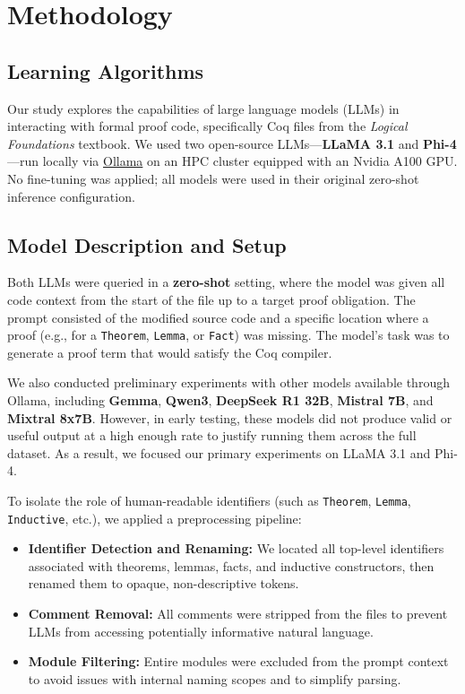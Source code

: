
\section{Methodology}
\label{sec:methodology}
\subsection{Learning Algorithms}

Our study explores the capabilities of large language models (LLMs) in interacting with formal proof code, specifically Coq files from the \textit{Logical Foundations} textbook. We used two open-source LLMs---\textbf{LLaMA 3.1} and \textbf{Phi-4}---run locally via \href{https://ollama.com}{Ollama} on an HPC cluster equipped with an Nvidia A100 GPU. No fine-tuning was applied; all models were used in their original zero-shot inference configuration.

\subsection{Model Description and Setup}

Both LLMs were queried in a \textbf{zero-shot} setting, where the model was given all code context from the start of the file up to a target proof obligation. The prompt consisted of the modified source code and a specific location where a proof (e.g., for a \texttt{Theorem}, \texttt{Lemma}, or \texttt{Fact}) was missing. The model’s task was to generate a proof term that would satisfy the Coq compiler.

We also conducted preliminary experiments with other models available through Ollama, including \textbf{Gemma}, \textbf{Qwen3}, \textbf{DeepSeek R1 32B}, \textbf{Mistral 7B}, and \textbf{Mixtral 8x7B}. However, in early testing, these models did not produce valid or useful output at a high enough rate to justify running them across the full dataset. As a result, we focused our primary experiments on LLaMA 3.1 and Phi-4.

To isolate the role of human-readable identifiers (such as \texttt{Theorem}, \texttt{Lemma}, \texttt{Inductive}, etc.), we applied a preprocessing pipeline:

\begin{itemize}
  \item \textbf{Identifier Detection and Renaming:} We located all top-level identifiers associated with theorems, lemmas, facts, and inductive constructors, then renamed them to opaque, non-descriptive tokens.
  \item \textbf{Comment Removal:} All comments were stripped from the files to prevent LLMs from accessing potentially informative natural language.
  \item \textbf{Module Filtering:} Entire modules were excluded from the prompt context to avoid issues with internal naming scopes and to simplify parsing.
\end{itemize}

